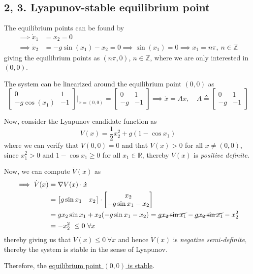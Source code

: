 \subsection*{2, 3. Lyapunov-stable equilibrium point}

The equilibrium points can be found by
\begin{align*}
    \implies
    \dot{x}_{1}
     & =
    x_{2} = 0
    \\
    \implies
    \dot{x}_{2}
     & =
    -g \sin (x_{1}) - x_{2} = 0
    \implies
    \sin (x_{1}) = 0
    \implies
    x_{1} = n \pi, \ n \in \mathbb{Z}
\end{align*}
giving the equilibrium points as \( (n \pi, 0) \), \( n \in \mathbb{Z} \), where we are only interested in \( (0, 0) \).

The system can be linearized around the equilibrium point \( (0, 0) \) as
\[
    \begin{bmatrix}
        0             & 1  \\
        -g \cos (x_1) & -1
    \end{bmatrix} \Bigg|_{x = (0, 0)}
    =
    \begin{bmatrix}
        0  & 1  \\
        -g & -1
    \end{bmatrix}
    \implies
    \dot x = Ax, \quad
    A \triangleq \begin{bmatrix} 0 & 1 \\ -g & -1 \end{bmatrix}
\]

Now, consider the Lyapunov candidate function as
\[
    V(x) = \frac{1}{2} x_2^2 + g (1 - \cos x_1)
\]
where we can verify that \( V(0, 0) = 0 \) and that \( V(x) > 0 \) for all \( x \neq (0, 0) \), since \( x_1^2 > 0 \) and \( 1 - \cos x_1 \geq 0 \) for all \( x_1 \in \mathbb{R} \), thereby \( V(x) \) is \emph{positive definite}.

Now, we can compute \( \dot V(x) \) as
\begin{align*}
    \implies
    \dot V(x)
     & =
    \nabla V(x) \cdot \dot x
    \\ & =
    \begin{bmatrix} g \sin x_1 & x_2 \end{bmatrix} \cdot \begin{bmatrix} x_2 \\ -g \sin x_1 - x_2 \end{bmatrix}
    \\ & =
    g x_2 \sin x_1 + x_2 (-g \sin x_1 - x_2)
    =
    \cancel{g x_2 \sin x_1} - \cancel{g x_2 \sin x_1} - x_2^2
    \\ & =
    -x_2^2 \ \leq 0 \ \forall x
\end{align*}
thereby giving us that \( \dot V(x) \leq 0 \ \forall x \) and hence \( \dot V(x) \) is \emph{negative semi-definite}, thereby the system is stable in the sense of Lyapunov.

Therefore, the \underline{equilibrium point \( (0, 0) \) is stable}.
